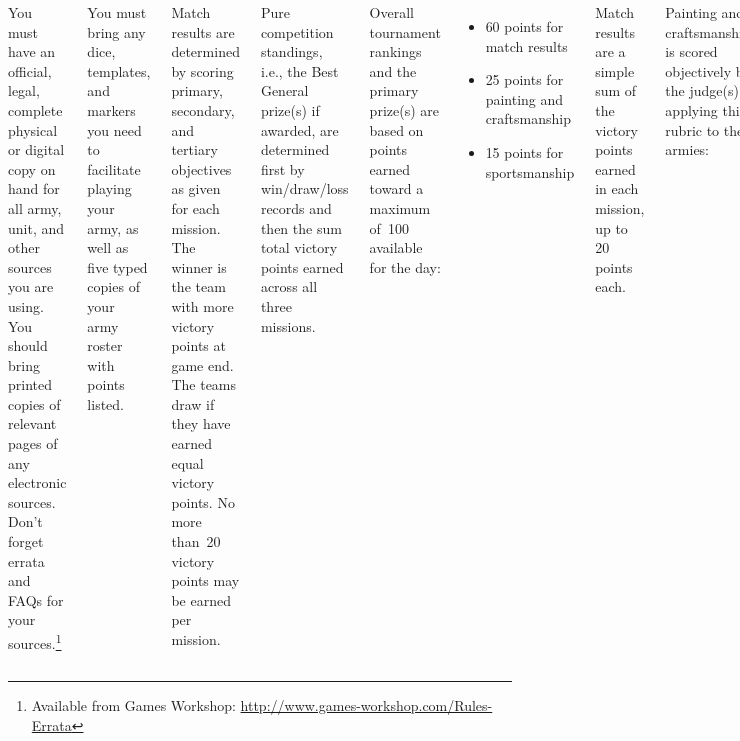\documentclass{40k}
\begin{document}
\begin{columns}

You must have an official, legal, complete physical or digital copy on
hand for all army, unit, and other sources you are using.  You should
bring printed copies of relevant pages of any electronic sources.
Don't forget errata and FAQs for your sources.\footnote{Available from
  Games Workshop:
  \url{http://www.games-workshop.com/Rules-Errata}}

You must bring any dice, templates, and markers you need to facilitate
playing your army, as well as five typed copies of your army roster
with points listed.


%

Match results are determined by scoring primary, secondary, and
tertiary objectives as given for each mission.  The winner is the team
with more victory points at game end.  The teams draw if they have
earned equal victory points.  No more than~20 victory points may be
earned per mission.

Pure competition standings, i.e., the Best General prize(s) if
awarded, are determined first by win/draw/loss records and then the
sum total victory points earned across all three missions.

Overall tournament rankings and the primary prize(s) are based on
points earned toward a maximum of~100 available for the day:
\begin{itemize}\shortlist
\item 60 points for match results
\item 25 points for painting and craftsmanship
\item 15 points for sportsmanship
\end{itemize}

Match results are a simple sum of the victory points earned in each
mission, up to 20 points each.

Painting and craftsmanship is scored objectively by the judge(s)
applying this rubric to the armies:

\begin{itemize}\shortlist
\item All models assembled and primed: +5 pts
\item All models three-color minimum: +5 pts
\item All models based (paint/flock): +5 pts
\item Advanced painting techniques present (washes, drybrushing, etc): +5 pts
\item Advanced basing techniques present: +5 pts
\end{itemize}


\end{columns}
\end{document}
